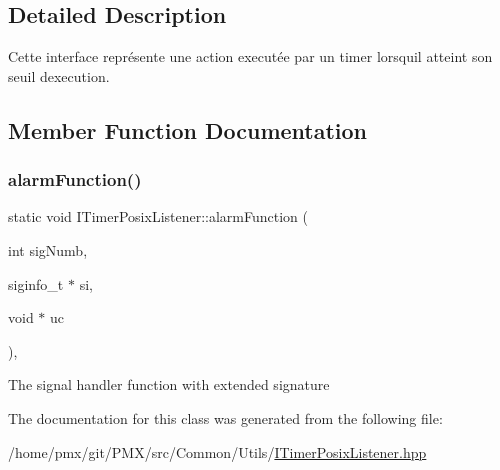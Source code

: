 \subsection{Detailed Description}
Cette interface représente une action executée par un timer lorsqu\textquotesingle{}il atteint son seuil d\textquotesingle{}execution. 

\subsection{Member Function Documentation}
\mbox{\label{classITimerPosixListener_af06fbcdd0f34a17d4341f896002860af}} 
\subsubsection{\texorpdfstring{alarm\+Function()}{alarmFunction()}}
{\footnotesize\ttfamily static void I\+Timer\+Posix\+Listener\+::alarm\+Function (\begin{DoxyParamCaption}\item[{int}]{sig\+Numb,  }\item[{siginfo\+\_\+t $\ast$}]{si,  }\item[{void $\ast$}]{uc }\end{DoxyParamCaption})\hspace{0.3cm}{\ttfamily [inline]}, {\ttfamily [static]}}

The signal handler function with extended signature 

The documentation for this class was generated from the following file\+:\begin{DoxyCompactItemize}
\item 
/home/pmx/git/\+P\+M\+X/src/\+Common/\+Utils/\hyperlink{ITimerPosixListener_8hpp}{I\+Timer\+Posix\+Listener.\+hpp}\end{DoxyCompactItemize}

